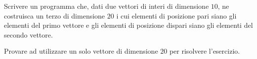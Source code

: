 \begin{Exercise}[label={ex:mischia}]
	Scrivere un programma che, dati due vettori di interi di dimensione $10$, ne costruisca un terzo di dimensione $20$ i cui elementi di posizione pari siano gli elementi del primo vettore e gli elementi di posizione dispari siano gli elementi del secondo vettore.

	Provare ad utilizzare un solo vettore di dimensione $20$ per risolvere l'esercizio.
\end{Exercise}

\begin{Answer}[ref={ex:mischia}]
  
\end{Answer}

